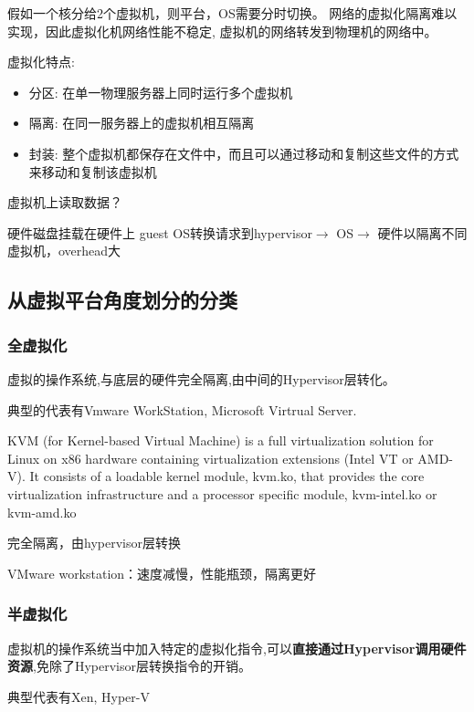 假如一个核分给2个虚拟机，则平台，OS需要分时切换。️ 网络的虚拟化隔离难以实现，因此虚拟化机网络性能不稳定, 虚拟机的网络转发到物理机的网络中。

虚拟化特点:

\begin{itemize}
    \item 分区: 在单一物理服务器上同时运行多个虚拟机
    \item 隔离: 在同一服务器上的虚拟机相互隔离
    \item 封装: 整个虚拟机都保存在文件中，而且可以通过移动和复制这些文件的方式来移动和复制该虚拟机
\end{itemize}

虚拟机上读取数据？ 

硬件磁盘挂载在硬件上 guest OS转换请求到hypervisor$\rightarrow$ OS$\rightarrow$ 硬件以隔离不同虚拟机，overhead大

\subsection{从虚拟平台角度划分的分类}

\subsubsection{全虚拟化}

\begin{definition}[全虚拟化]
    虚拟的操作系统,与底层的硬件完全隔离,由中间的Hypervisor层转化。 
    
    典型的代表有Vmware WorkStation, Microsoft Virtrual Server. 
\end{definition}

\begin{definition}[KVM]
    KVM (for Kernel-based Virtual Machine) is a full virtualization solution for Linux on x86 hardware containing virtualization extensions (Intel VT or AMD-V). It consists of a loadable kernel module, kvm.ko, that provides the core virtualization infrastructure and a processor specific module, kvm-intel.ko or kvm-amd.ko
\end{definition}

完全隔离，由hypervisor层转换 

VMware workstation：速度减慢，性能瓶颈，隔离更好

\subsubsection{半虚拟化}

\begin{definition}[半虚拟化]
    虚拟机的操作系统当中加入特定的虚拟化指令,可以\textbf{直接通过Hypervisor调用硬件资源},免除了Hypervisor层转换指令的开销。 
    
    典型代表有Xen, Hyper-V
\end{definition}

